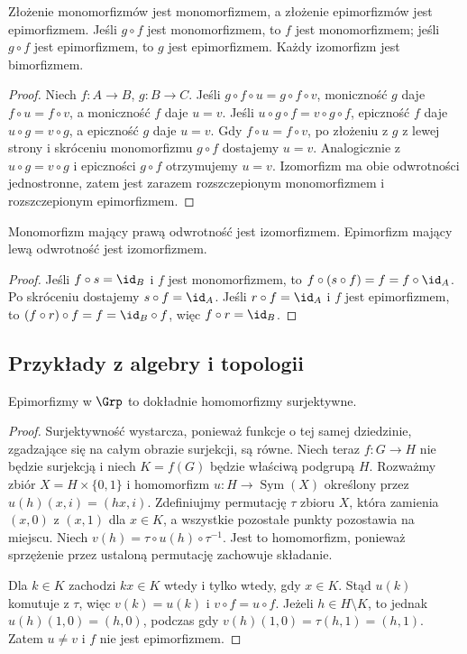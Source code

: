 \begin{stwierdzenie}\label{cat:prop:skracanie}
Złożenie monomorfizmów jest monomorfizmem, a złożenie epimorfizmów jest epimorfizmem. Jeśli $g\circ f$ jest monomorfizmem, to $f$ jest monomorfizmem; jeśli $g\circ f$ jest epimorfizmem, to $g$ jest epimorfizmem. Każdy izomorfizm jest bimorfizmem.
\end{stwierdzenie}
\begin{proof}
Niech $f:A\to B$, $g:B\to C$. Jeśli $g\circ f\circ u=g\circ f\circ v$, moniczność $g$ daje $f\circ u=f\circ v$, a moniczność $f$ daje $u=v$. Jeśli $u\circ g\circ f=v\circ g\circ f$, epiczność $f$ daje $u\circ g=v\circ g$, a epiczność $g$ daje $u=v$.
Gdy $f\circ u=f\circ v$, po złożeniu z $g$ z lewej strony i skróceniu monomorfizmu $g\circ f$ dostajemy $u=v$. Analogicznie z $u\circ g=v\circ g$ i epiczności $g\circ f$ otrzymujemy $u=v$. Izomorfizm ma obie odwrotności jednostronne, zatem jest zarazem rozszczepionym monomorfizmem i rozszczepionym epimorfizmem.
\end{proof}

\begin{stwierdzenie}\label{cat:prop:bimorfizm-rozszczepiony}
Monomorfizm mający prawą odwrotność jest izomorfizmem. Epimorfizm mający lewą odwrotność jest izomorfizmem.
\end{stwierdzenie}
\begin{proof}
Jeśli $f\circ s=\id_B$ i $f$ jest monomorfizmem, to $f\circ(s\circ f)=f=f\circ\id_A$. Po skróceniu dostajemy $s\circ f=\id_A$. Jeśli $r\circ f=\id_A$ i $f$ jest epimorfizmem, to $(f\circ r)\circ f=f=\id_B\circ f$, więc $f\circ r=\id_B$.
\end{proof}

\subsection{Przykłady z algebry i topologii}

\begin{twierdzenie}\label{cat:thm:epi-grp}
Epimorfizmy w $\Grp$ to dokładnie homomorfizmy surjektywne.
\end{twierdzenie}
\begin{proof}
Surjektywność wystarcza, ponieważ funkcje o tej samej dziedzinie, zgadzające się na całym obrazie surjekcji, są równe. Niech teraz $f:G\to H$ nie będzie surjekcją i niech $K=f(G)$ będzie właściwą podgrupą $H$. Rozważmy zbiór $X=H\times\{0,1\}$ i homomorfizm $u:H\to\operatorname{Sym}(X)$ określony przez $u(h)(x,i)=(hx,i)$. Zdefiniujmy permutację $\tau$ zbioru $X$, która zamienia $(x,0)$ z $(x,1)$ dla $x\in K$, a wszystkie pozostałe punkty pozostawia na miejscu. Niech $v(h)=\tau\circ u(h)\circ\tau^{-1}$. Jest to homomorfizm, ponieważ sprzężenie przez ustaloną permutację zachowuje składanie.

Dla $k\in K$ zachodzi $kx\in K$ wtedy i tylko wtedy, gdy $x\in K$. Stąd $u(k)$ komutuje z $\tau$, więc $v(k)=u(k)$ i $v\circ f=u\circ f$. Jeżeli $h\in H\setminus K$, to jednak $u(h)(1,0)=(h,0)$, podczas gdy $v(h)(1,0)=\tau(h,1)=(h,1)$. Zatem $u\ne v$ i $f$ nie jest epimorfizmem.
\end{proof}

